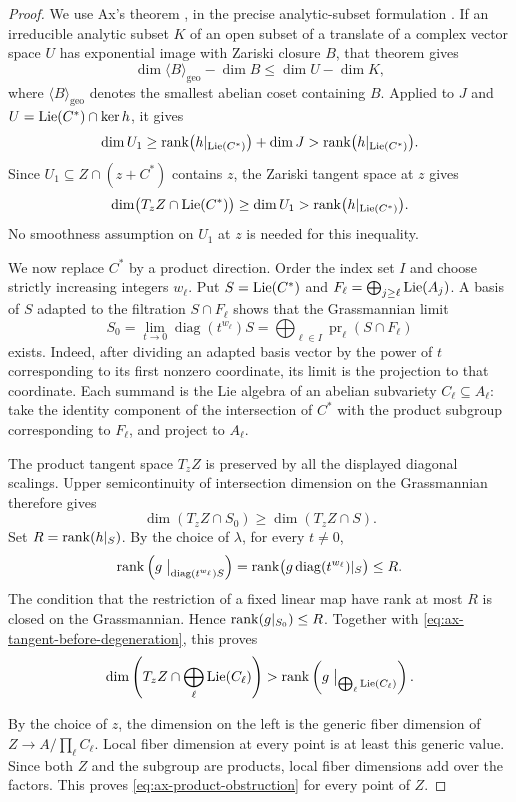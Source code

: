 \begin{proof}
We use Ax's theorem \cite{Ax1972}, in the precise analytic-subset formulation
\cite[Theorem~5.3]{HabeggerPila2016}. If an irreducible analytic subset
$K$ of an open subset of a translate of a complex vector space $U$
has exponential image with Zariski closure $B$, that theorem gives
\[
 \dim\langle B\rangle_{\mathrm{geo}}-\dim B
 \leq\dim U-\dim K,
\]
where $\langle B\rangle_{\mathrm{geo}}$ denotes the smallest abelian
coset containing $B$. Applied to $J$ and
$U=\operatorname{Lie}(C^*)\cap\ker h$, it gives
\[
 \dim U_1\geq
 \operatorname{rank}\bigl(h|_{\operatorname{Lie}(C^*)}\bigr)+\dim J
 >\operatorname{rank}\bigl(h|_{\operatorname{Lie}(C^*)}\bigr).
\]
Since $U_1\subseteq Z\cap(z+C^*)$ contains $z$, the Zariski tangent
space at $z$ gives
\begin{equation}\label{eq:ax-tangent-before-degeneration}
 \dim\bigl(T_zZ\cap\operatorname{Lie}(C^*)\bigr)
 \geq\dim U_1
 >\operatorname{rank}\bigl(h|_{\operatorname{Lie}(C^*)}\bigr).
\end{equation}
No smoothness assumption on $U_1$ at $z$ is needed for this inequality.

We now replace $C^*$ by a product direction. Order the index set $I$
and choose strictly increasing integers $w_\ell$. Put
$S=\operatorname{Lie}(C^*)$ and $F_\ell=\bigoplus_{j\geq\ell}\operatorname{Lie}(A_j)$.
A basis of $S$ adapted to the filtration $S\cap F_\ell$ shows that
the Grassmannian limit
\[
 S_0=\lim_{t\longrightarrow0}
       \operatorname{diag}(t^{w_\ell})S
     =\bigoplus_{\ell\in I}\operatorname{pr}_\ell(S\cap F_\ell)
\]
exists. Indeed, after dividing an adapted basis vector by the power of
$t$ corresponding to its first nonzero coordinate, its limit is the
projection to that coordinate. Each summand is the Lie algebra of an
abelian subvariety $C_\ell\subseteq A_\ell$: take the identity component
of the intersection of $C^*$ with the product subgroup corresponding
to $F_\ell$, and project to $A_\ell$.

The product tangent space $T_zZ$ is preserved by all the displayed
diagonal scalings. Upper semicontinuity of intersection dimension on
the Grassmannian therefore gives
\[
 \dim(T_zZ\cap S_0)\geq\dim(T_zZ\cap S).
\]
Set $R=\operatorname{rank}(h|_S)$. By the choice of $\lambda$, for every $t\neq0$,
\[
 \operatorname{rank}\left(g\bigm|_{\operatorname{diag}(t^{w_\ell})S}\right)
 =\operatorname{rank}\bigl(g\operatorname{diag}(t^{w_\ell})|_S\bigr)\leq R.
\]
The condition that the restriction of a fixed linear map have rank
at most $R$ is closed on the Grassmannian. Hence
$\operatorname{rank}(g|_{S_0})\leq R$. Together with
\eqref{eq:ax-tangent-before-degeneration}, this proves
\[
 \dim\left(T_zZ\cap\bigoplus_\ell\operatorname{Lie}(C_\ell)\right)
 >\operatorname{rank}\left(g\bigm|_{\bigoplus_\ell\operatorname{Lie}(C_\ell)}\right).
\]

By the choice of $z$, the dimension on the left is the generic fiber
dimension of $Z\longrightarrow A/\prod_\ell C_\ell$.
Local fiber dimension at every point is at least this generic value.
Since both $Z$ and the subgroup are products, local fiber dimensions
add over the factors. This proves
\eqref{eq:ax-product-obstruction} for every point of $Z$.
\end{proof}

